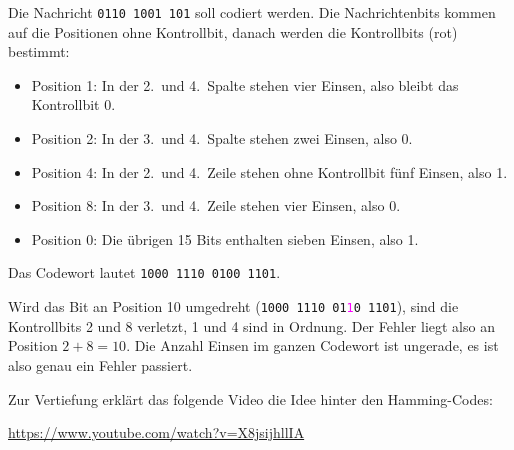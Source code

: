 \begin{myexample}\label{ex:hamming-codierung}
    Die Nachricht \texttt{0110 1001 101} soll codiert werden. Die
    Nachrichtenbits kommen auf die Positionen ohne Kontrollbit, danach
    werden die Kontrollbits (rot) bestimmt:

    \begin{center}
    \end{center}

    \begin{itemize}
        \item Position 1: In der 2.\ und 4.\ Spalte stehen vier Einsen,
              also bleibt das Kontrollbit 0.
        \item Position 2: In der 3.\ und 4.\ Spalte stehen zwei Einsen,
              also 0.
        \item Position 4: In der 2.\ und 4.\ Zeile stehen ohne
              Kontrollbit fünf Einsen, also 1.
        \item Position 8: In der 3.\ und 4.\ Zeile stehen vier Einsen,
              also 0.
        \item Position 0: Die übrigen 15 Bits enthalten sieben Einsen,
              also 1.
    \end{itemize}
    Das Codewort lautet \texttt{1000 1110 0100 1101}.

    Wird das Bit an Position 10 umgedreht
    (\texttt{1000 1110 01\textcolor{magenta}{1}0 1101}), sind die
    Kontrollbits 2 und 8 verletzt, 1 und 4 sind in Ordnung. Der Fehler
    liegt also an Position \(2+8=10\). Die Anzahl Einsen im ganzen
    Codewort ist ungerade, es ist also genau ein Fehler passiert.

    Zur Vertiefung erklärt das folgende Video die Idee hinter den
    Hamming-Codes:

    \begin{center}
        \url{https://www.youtube.com/watch?v=X8jsijhllIA}
    \end{center}
\end{myexample}

